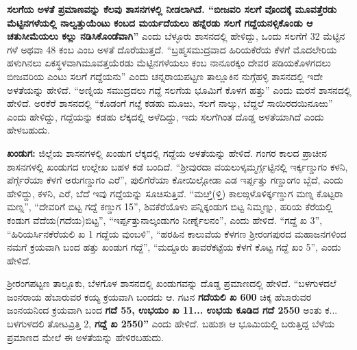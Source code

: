 \vskip 2pt

\textbf{ಸಲಗೆಯ ಅಳತೆ ಪ್ರಮಾಣವನ್ನು ಕೆಲವು ಶಾಸನಗಳಲ್ಲಿ ನೀಡಲಾಗಿದೆ. “ಬೀಜವರಿ ಸಲಗೆ ವೊಂದಕ್ಕೆ ಮೂವತ್ತೆರಡು\general{\break } ಮೆಟ್ಟಿನಗಳೆಯಲ್ಲಿ ನಾಲ್ವತ್ತುಯೆಂಟು ಕಂಬದ ಮರ್ಯದೆಯಲು ಹನ್ನೆರಡು ಸಲಗೆ ಗದ್ದೆಯನಳ್ಸಿಕೊಂಡು ಆ ಚತುಸೀಮೆಯಲು ಕಲ್ಲು ನಡಿಸಿಕೊಂಡೆವಾಗಿ”} ಎಂದು ಬೆಳ್ಳೂರು ಶಾಸನದಲ್ಲಿ ಹೇಳಿದ್ದು, ಒಂದು ಸಲಗೆಗೆ 32 ಮೆಟ್ಟಿನ ಗಳೆ ಅಥವಾ 48 ಕಂಬ ಎಂಬ ಅಳತೆ ದೊರೆಯುತ್ತದೆ. “ಬ್ರಹ್ಮಸಮುದ್ರವಾದ ಹಿರಿಯಕೆರೆಯ ಕೆಳಗೆ ಮೊದಲೇರಿಯ ಹಳುಗಿನಲು ಏಕಸ್ಥಳವಾಗಿ\break ಮೂವತ್ತಯೆರಡು ಮೆಟ್ಟಿನಗಳೆಯಲು ಕಂಬ ನಾನೂರಕ್ಕಂ ದೇವರ ಪಡಿಯಕೊಳಗದಲು ಬೀಜವರಿಯ ಎಂಟು ಸಲಗೆ ಗದ್ದೆಯನು” ಎಂದು ಚನ್ನರಾಯಪಟ್ಟಣ ತಾಲ್ಲೂಕಿನ ನುಗ್ಗೆಹಳ್ಳಿ ಶಾಸನದಲ್ಲಿ ಇದೇ ಅಳತೆಯನ್ನು ಹೇಳಿದೆ. “ಅಣ್ನಿಯ ಸಮುದ್ರದಲು ಗದ್ದೆ ಸಲಗೆಯ ಭೂಮಿಗೆ ಕೊಳಗ ಹತ್ತು” ಎಂದು ಮರಸೆ ಶಾಸನದಲ್ಲಿ ಹೇಳಿದೆ. ಅರಕೆರೆ ಶಾಸನದಲ್ಲಿ “ಕೊಡಂಗೆ ಗೞ್ದೆ ಕಡಹು ಮೂಱು, ಸಲಗೆ ನಾಲ್ಕು, ಬೆದ್ದಲೆ ಸಾಯಿರದಯಿನೂಱು” ಎಂದು ಹೇಳಿದ್ದು, ಗದ್ದೆಯನ್ನು ಕಡಹು ಲೆಕ್ಕದಲ್ಲಿ ಅಳೆದಿದ್ದು, ಇದು ಸಲಗೆಗಿಂತ ದೊಡ್ಡ ಅಳತೆಯಾಗಿದೆ ಎಂದು ಹೇಳಬಹುದು.

\vskip 2pt

\textbf{ಖಂಡುಗ:} ಜಿಲ್ಲೆಯ ಶಾಸನಗಳಲ್ಲಿ ಖಂಡುಗ ಲೆಕ್ಕದಲ್ಲಿ ಗದ್ದೆಯ ಅಳತೆಯನ್ನು ಹೇಳಿದೆ. ಗಂಗರ ಕಾಲದ ಪ್ರಾಚೀನ ಶಾಸನಗಳಲ್ಲಿ ಖಂಡುಗದ ಉಲ್ಲೇಖ ಬಹಳ ಕಡೆ ಬಂದಿದೆ. “ಶ‍್ರೀವುರದಾ ವಯಲುಳ್ಕಮ್ಮರ್ಗ್ಗಟ್ಟಿನಲ್ಲಿ ಇರ್ಕ್ಕಣ್ಡುಗಂ ಕಳನಿ, ಪೆರ್ಗ್ಗೆರೆಯಾ ಕೆಳಗೆ ಅರುಗಣ್ಡುಗಂ ಎರೆ”, ಪುಲಿಗೆರೆಯಾ ಕೋಯಿಲ್ಗೋಡಾ ಎಡ ಇರ್ಪ್ಪತ್ತು ಗಣ್ಡುಂಗಂ ಬ್ಬೆದೆ, ಎಂದು ಹೇಳಿದ್ದು, ಕಳನಿ, ಎರೆ, ಬೆದೆ ಇವು ಗದ್ದೆಯನ್ನು ಸೂಚಿಸುತ್ತಿವೆ. “ಮೞ್ತಿ(ಳ್ತಿ) ಕಾಲಙ್ಗಳೊಳಿರ್ಕ್ಕಣ್ಡುಗ ಮಣ್ನ ಕೊಟ್ಟರಾ ಮಣ್ನ”, “ದೇವರಿಗೆ ಬಿಟ್ಟ ಗದ್ದೆ ಕಣ್ಡುಗ 15”, ಶಿವಕೆರೆಯೊಳು ಪನ್ನಿಕ್ಕಂಡುಗ ಬಿಟ್ಟ ನಿಮ್ಮಣ್ನು, ಹರಿಯ ಕೆರೆಯಲ್ಲಿ ಕಂಡುಗ ವೆದೆಯ(ಗದೆಯ)ಬಿಟ್ಟ”, “ಇರ್ಪ್ಪತ್ತುನಾಲ್ಕಂಡುಗಂ ನೀರ್ಣ್ನೆಲನಂ”, ಎಂದು ಹೇಳಿದೆ. “ಗದ್ದೆ ಖ 3”, “ಹಿರಿಯರ್ಸಿನಕೆರೆಯಲಿ ಖ 1 ಗದ್ದೆಯ ವುಂಬಳಿ”, “ಹರಹಿನ ಕಾಲುವೆಯ ಕೆಳಗಣ ಶ‍್ರೀರಂಗಪುರದ ಮಹಾಜನಗಳಿಂದ ನಮಗೆ ಕ್ರಯವಾಗಿ ಬಂದ ಹತ್ತು ಖಂಡುಗ ಗದ್ದೆ”, “ಮದ್ದೂರು ತಾವರೆಕಟ್ಟೆಯ ಕೆಳಗೆ ಕೊಟ್ಟ ಗದ್ದೆ ಖಂ 5”, ಎಂದು ಹೇಳಿದೆ.

\vskip 2pt

ಶ‍್ರೀರಂಗಪಟ್ಟಣ ತಾಲ್ಲೂಕು, ಬೆಳಗೊಳ ಶಾಸನದಲ್ಲಿ ಖಂಡುಗವನ್ನು ದೊಡ್ಡ ಪ್ರಮಾಣದಲ್ಲಿ ಹೇಳಿದೆ. “ಬಳಗುಳದಲೆ ಜಂನರಾಯ ಹೆಬಾರುವರ ಕಯ್ಯ ಕ್ರಯವಾಗಿ ಬಂದದು ಆ. ಗಟನ \textbf{ಗದೆಯಲಿ ಖ 600} ಚಿಕ್ಕ ಹೆಬಾರುವರ ಜಂನಯನಿಂದ ಕ್ರಯವಾಗಿ ಬಂದ \textbf{ಗದೆ 55, ಉಭಯಂ ಖ 11... ಉಭಯ ಕೂಡಿದ ಗದೆ 2550} ಅಂತು ಕ... ಬಳಗುಳದಲಿ ತೋಟವ್ರಿತ್ತಿ 2, \textbf{ಗದ್ದೆ ಖ 2550”} ಎಂದು ಹೇಳಿದೆ. ಬಹುಶಃ ಆ ಭೂಮಿಯಲ್ಲಿ ಬರುತ್ತಿದ್ದ ಬೆಳೆಯ ಪ್ರಮಾಣದ ಮೇಲೆ ಈ ಅಳತೆಯನ್ನು ಹೇಳಿರಬಹುದು.

